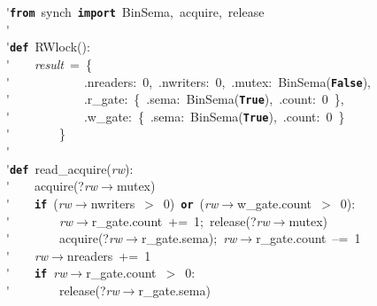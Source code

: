 \'\>\texttt{\textbf{from}}~synch~\texttt{\textbf{import}}~BinSema,~acquire,~release\\

\'\>\\

\'\>\texttt{\textbf{def}}~RWlock():\\

\'\>~~~~\textit{result}~=~\{\\

\'\>~~~~~~~~~~~~.nreaders:~0,~.nwriters:~0,~.mutex:~BinSema(\texttt{\textbf{False}}),\\

\'\>~~~~~~~~~~~~.r\_gate:~\{~.sema:~BinSema(\texttt{\textbf{True}}),~.count:~0~\},\\

\'\>~~~~~~~~~~~~.w\_gate:~\{~.sema:~BinSema(\texttt{\textbf{True}}),~.count:~0~\}\\

\'\>~~~~~~~~\}\\

\'\>\\

\'\>\texttt{\textbf{def}}~read\_acquire(\textit{rw}):\\

\'\>~~~~acquire(?\textit{rw}$\rightarrow$mutex)\\

\'\>~~~~\texttt{\textbf{if}}~(\textit{rw}$\rightarrow$nwriters~$>$~0)~\texttt{\textbf{or}}~(\textit{rw}$\rightarrow$w\_gate.count~$>$~0):\\

\'\>~~~~~~~~\textit{rw}$\rightarrow$r\_gate.count~+=~1;~release(?\textit{rw}$\rightarrow$mutex)\\

\'\>~~~~~~~~acquire(?\textit{rw}$\rightarrow$r\_gate.sema);~\textit{rw}$\rightarrow$r\_gate.count~--=~1\\

\'\>~~~~\textit{rw}$\rightarrow$nreaders~+=~1\\

\'\>~~~~\texttt{\textbf{if}}~\textit{rw}$\rightarrow$r\_gate.count~$>$~0:\\

\'\>~~~~~~~~release(?\textit{rw}$\rightarrow$r\_gate.sema)\\

